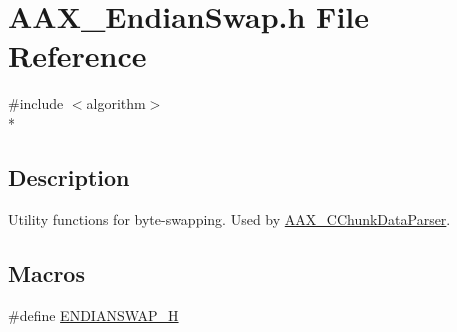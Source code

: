 \hypertarget{a00205}{}\section{A\+A\+X\+\_\+\+Endian\+Swap.\+h File Reference}
\label{a00205}
{\ttfamily \#include $<$algorithm$>$}\\*


\subsection{Description}
Utility functions for byte-\/swapping. Used by \hyperlink{a00014}{A\+A\+X\+\_\+\+C\+Chunk\+Data\+Parser}. 

\subsection*{Macros}
\begin{DoxyCompactItemize}
\item 
\#define \hyperlink{a00205_a8bad80e5aaa9c0a227bf53589dfa181b}{E\+N\+D\+I\+A\+N\+S\+W\+A\+P\+\_\+\+H}
\end{DoxyCompactItemize}
